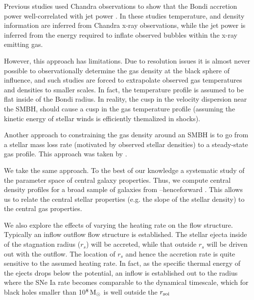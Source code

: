 \documentclass[usenatbib,fleqn]{mn2e}
\newcommand{\rs}{r_s}
\newcommand{\soi}{\rm soi}
\newcommand{\rsoi}{r_{\soi}}
\begin{document}
Previous studies used Chandra observations to show that the Bondi accretion power well-correlated with jet power \citep{AllenDunn+:2006a,FujitaKawakatu+:2014a}. In these studies temperature, and density information are inferred from Chandra x-ray observations, while the jet power is inferred from the energy required to inflate observed bubbles within the x-ray emitting gas. 

However, this approach has limitations. Due to resolution issues it is almost never possible to observationally determine the gas density at the black sphere of influence, and such studies are forced to extrapolate observed gas temperatures and densities to smaller scales.  In fact, the temperature profile is assumed to be flat inside of the Bondi radius.  In reality, the cusp in the velocity dispersion near the SMBH, should cause a cusp in the gas temperature profile (assuming the kinetic energy of stellar winds is efficiently themalized in shocks). 

Another approach to constraining the gas density around an SMBH is to go from a stellar mass loss rate (motivated by observed stellar densities) to a steady-state gas profile. This approach was taken by \citealt{Quataert:2004a,De-ColleGuillochon+:2012a,ShcherbakovWong+:2014a}. 

We take the same approach. To the best of our knowledge a systematic study of the parameter space of central galaxy properties. Thus, we compute central density profiles for a broad sample of galaxies from \citealt{WangMerritt:2004a}--henceforward .  This allows us to relate the central stellar properties (e.g. the slope of the stellar density) to the central gas properties. 

We also explore the effects of varying the heating rate on the flow structure. Typically an inflow outflow flow structure is established. The stellar ejecta inside of the stagnation radius ($\rs$) will be accreted, while that outside $\rs$ will be driven out with the outflow. The location of $\rs$ and hence the accretion rate is  quite sensitive to the assumed heating rate.  In fact, as the specific thermal energy of the ejects drops below the potential, an inflow is established out to the radius where the SNe Ia rate becomes comparable to the dynamical timescale, which for black holes smaller than 10$^8 \,{\rm M_\odot}$ is well outside the $\rsoi$ 
\end{document}

